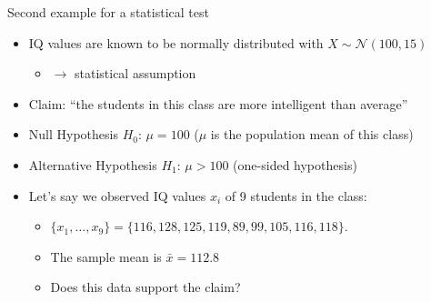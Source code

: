 \begin{frame}[c]{Second example for a statistical test}

\begin{itemize}
  \item IQ values are known to be normally distributed with $X \sim
  \mathcal{N}(100,15)$
  \begin{itemize}
    \item$\to$ statistical assumption
  \end{itemize}
  \item Claim: \alert{``the students in this class are more intelligent
  than average''}
  \bigskip
  \pause
  \item \alert{Null Hypothesis $H_0$}: $\mu=100$ ($\mu$ is the population
  mean of this class)
  \item \alert{Alternative Hypothesis $H_1$}: $\mu>100$ (\alert{one-sided} hypothesis)

\bigskip
\pause

  \item Let's say we observed IQ values $x_i$ of 9 students in the class:
    \begin{itemize}
	  \item $\{x_1,\dots,x_9\} = \{116, 128, 125, 119, 89, 99, 105, 116, 118\}$.
	  \item The \alert{sample mean} is $\bar{x}=112.8$
	  \item Does this data support the claim?
	\end{itemize}	

\end{itemize}	

\end{frame}


